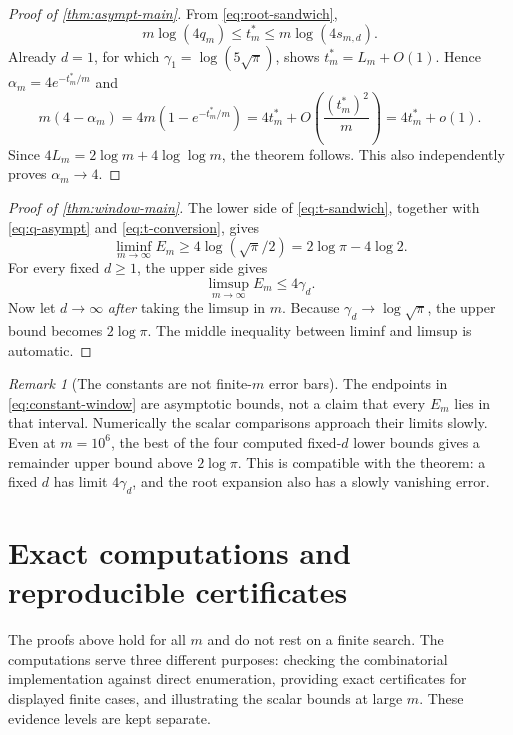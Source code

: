 \documentclass[11pt,a4paper]{article}
\theoremstyle{definition}\newaliascnt{definition}{theorem}
\theoremstyle{remark}\newaliascnt{remark}{theorem}
\newtheorem{remark}[remark]{Remark}
\begin{document}
\begin{proof}[Proof of \cref{thm:asympt-main}]
From \eqref{eq:root-sandwich},
\begin{equation}
 m\log(4q_m)\le t_m^*\le m\log(4s_{m,d}).
 \label{eq:t-sandwich}
\end{equation}
Already $d=1$, for which $\gamma_1=\log(5\sqrt\pi)$, shows
$t_m^*=L_m+O(1)$. Hence $\alpha_m=4e^{-t_m^*/m}$ and
\begin{equation}
 m(4-\alpha_m)=4m(1-e^{-t_m^*/m})
 =4t_m^*+O\!\left(\frac{(t_m^*)^2}{m}\right)
 =4t_m^*+o(1).
 \label{eq:t-conversion}
\end{equation}
Since $4L_m=2\log m+4\log\log m$, the theorem follows.
This also independently proves $\alpha_m\to4$.
\end{proof}

\begin{proof}[Proof of \cref{thm:window-main}]
The lower side of \eqref{eq:t-sandwich}, together with
\eqref{eq:q-asympt} and \eqref{eq:t-conversion}, gives
\[
 \liminf_{m\to\infty}E_m\ge4\log(\sqrt\pi/2)
   =2\log\pi-4\log2.
\]
For every fixed $d\ge1$, the upper side gives
\[
 \limsup_{m\to\infty}E_m\le4\gamma_d.
\]
Now let $d\to\infty$ \emph{after} taking the limsup in $m$.
Because $\gamma_d\to\log\sqrt\pi$, the upper bound becomes $2\log\pi$.
The middle inequality between liminf and limsup is automatic.
\end{proof}

\begin{remark}[The constants are not finite-$m$ error bars]
The endpoints in \eqref{eq:constant-window} are asymptotic bounds, not a
claim that every $E_m$ lies in that interval. Numerically the scalar
comparisons approach their limits slowly. Even at $m=10^6$, the best of
the four computed fixed-$d$ lower bounds gives a remainder upper bound
above $2\log\pi$. This is compatible with the theorem: a fixed $d$ has
limit $4\gamma_d$, and the root expansion also has a slowly vanishing
error.
\end{remark}

\section{Exact computations and reproducible certificates}
\label{sec:computation}
The proofs above hold for all $m$ and do not rest on a finite search.
The computations serve three different purposes: checking the combinatorial
implementation against direct enumeration, providing exact certificates
for displayed finite cases, and illustrating the scalar bounds at large
$m$. These evidence levels are kept separate.
\end{document}
